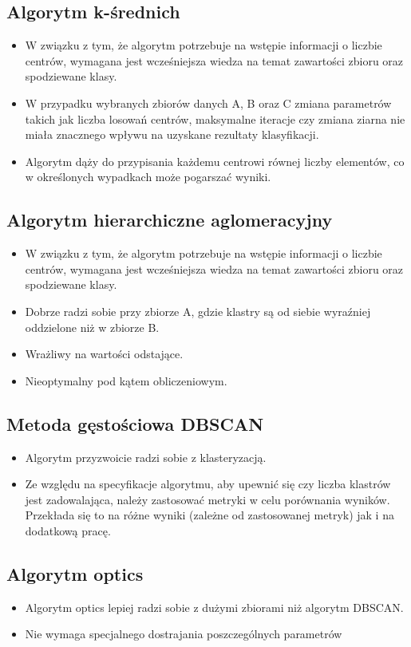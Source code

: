 \documentclass[a4paper,11pt]{article}
\begin{document}
\subsection*{Algorytm k-średnich}
\begin{itemize}
    \item W związku z tym, że algorytm potrzebuje na wstępie informacji o liczbie centrów, wymagana jest wcześniejsza wiedza na temat zawartości zbioru oraz spodziewane klasy.
    \item W przypadku wybranych zbiorów danych A, B oraz C zmiana parametrów takich jak liczba losowań centrów, maksymalne iteracje czy zmiana ziarna nie miała znacznego wpływu na uzyskane rezultaty klasyfikacji.
    \item Algorytm dąży do przypisania każdemu centrowi równej liczby elementów, co w określonych wypadkach może pogarszać wyniki.
\end{itemize}

\subsection*{Algorytm hierarchiczne aglomeracyjny}
\begin{itemize}
    \item W związku z tym, że algorytm potrzebuje na wstępie informacji o liczbie centrów, wymagana jest wcześniejsza wiedza na temat zawartości zbioru oraz spodziewane klasy.
    \item Dobrze radzi sobie przy zbiorze A, gdzie klastry są od siebie wyraźniej oddzielone niż w zbiorze B.
    \item Wrażliwy na wartości odstające.
    \item Nieoptymalny pod kątem obliczeniowym.
\end{itemize}

\subsection*{Metoda gęstościowa DBSCAN}
\begin{itemize}
    \item Algorytm przyzwoicie radzi sobie z klasteryzacją.
    \item Ze względu na specyfikacje algorytmu, aby upewnić się czy liczba klastrów jest zadowalająca, należy zastosować metryki w celu porównania wyników. Przekłada się to na różne wyniki (zależne od zastosowanej metryk) jak i na dodatkową pracę. 
\end{itemize}
\subsection*{Algorytm optics}
\begin{itemize}
    \item Algorytm optics lepiej radzi sobie z dużymi zbiorami niż algorytm DBSCAN.
    \item  Nie wymaga specjalnego dostrajania poszczególnych parametrów
\end{itemize}
\end{document}
